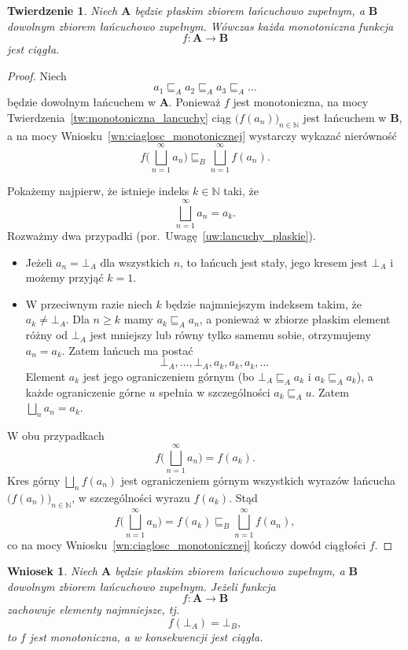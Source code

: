 \documentclass[11pt,a4paper]{article}
\theoremstyle{definition}
\theoremstyle{plain}
\newtheorem{twierdzenie}[definicja]{Twierdzenie}
\newtheorem{wniosek}[definicja]{Wniosek}
\newcommand{\bt}{\bot}                            %
\begin{document}
\begin{twierdzenie}\label{tw:monotonna_plaska_ciagla}
	Niech $\boldsymbol{A}$ będzie płaskim zbiorem łańcuchowo zupełnym,
	a $\boldsymbol{B}$ dowolnym zbiorem łańcuchowo zupełnym. Wówczas każda
	monotoniczna funkcja
	\[
	f:\boldsymbol{A}\to\boldsymbol{B}
	\]
	jest ciągła.
\end{twierdzenie}

\begin{proof}
	Niech
	\[
	a_1\sqsubseteq_A a_2\sqsubseteq_A a_3\sqsubseteq_A\ldots
	\]
	będzie dowolnym łańcuchem w $\boldsymbol{A}$. Ponieważ $f$ jest
	monotoniczna, na mocy Twierdzenia~\ref{tw:monotoniczna_lancuchy} ciąg
	$\big(f(a_n)\big)_{n\in\mathbb N}$ jest łańcuchem w $\boldsymbol{B}$,
	a na mocy Wniosku~\ref{wn:ciaglosc_monotonicznej} wystarczy wykazać
	nierówność
	\[
	f\Big(\bigsqcup_{n=1}^{\infty}a_n\Big)
	\sqsubseteq_B
	\bigsqcup_{n=1}^{\infty}f(a_n).
	\]
	
	Pokażemy najpierw, że istnieje indeks $k\in\mathbb N$ taki, że
	\[
	\bigsqcup_{n=1}^{\infty}a_n=a_k.
	\]
	Rozważmy dwa przypadki (por.\ Uwagę~\ref{uw:lancuchy_plaskie}).
	\begin{itemize}
		\item Jeżeli $a_n=\bt_A$ dla wszystkich $n$, to łańcuch jest stały,
		jego kresem jest $\bt_A$ i możemy przyjąć $k=1$.
		\item W przeciwnym razie niech $k$ będzie najmniejszym indeksem
		takim, że $a_k\neq\bt_A$. Dla $n\geq k$ mamy $a_k\sqsubseteq_A a_n$,
		a ponieważ w zbiorze płaskim element różny od $\bt_A$ jest mniejszy
		lub równy tylko samemu sobie, otrzymujemy $a_n=a_k$. Zatem łańcuch
		ma postać
		\[
		\bt_A,\ldots,\bt_A,a_k,a_k,a_k,\ldots
		\]
		Element $a_k$ jest jego ograniczeniem górnym (bo $\bt_A\sqsubseteq_A a_k$
		i $a_k\sqsubseteq_A a_k$), a każde ograniczenie górne $u$ spełnia
		w szczególności $a_k\sqsubseteq_A u$. Zatem
		$\bigsqcup_{n}a_n=a_k$.
	\end{itemize}
	
	W obu przypadkach
	\[
	f\Big(\bigsqcup_{n=1}^{\infty}a_n\Big)=f(a_k).
	\]
	Kres górny $\bigsqcup_{n}f(a_n)$ jest ograniczeniem górnym wszystkich
	wyrazów łańcucha $\big(f(a_n)\big)_{n\in\mathbb N}$, w szczególności
	wyrazu $f(a_k)$. Stąd
	\[
	f\Big(\bigsqcup_{n=1}^{\infty}a_n\Big)
	=
	f(a_k)
	\sqsubseteq_B
	\bigsqcup_{n=1}^{\infty}f(a_n),
	\]
	co na mocy Wniosku~\ref{wn:ciaglosc_monotonicznej} kończy dowód
	ciągłości $f$.
\end{proof}

\begin{wniosek}\label{wn:plaskie_monotoniczne_ciagle}
	Niech $\boldsymbol{A}$ będzie płaskim zbiorem łańcuchowo zupełnym,
	a $\boldsymbol{B}$ dowolnym zbiorem łańcuchowo zupełnym. Jeżeli funkcja
	\[
	f:\boldsymbol{A}\to\boldsymbol{B}
	\]
	zachowuje elementy najmniejsze, tj.
	\[
	f(\bt_A)=\bt_B,
	\]
	to $f$ jest monotoniczna, a w konsekwencji jest ciągła.
\end{wniosek}
\end{document}
